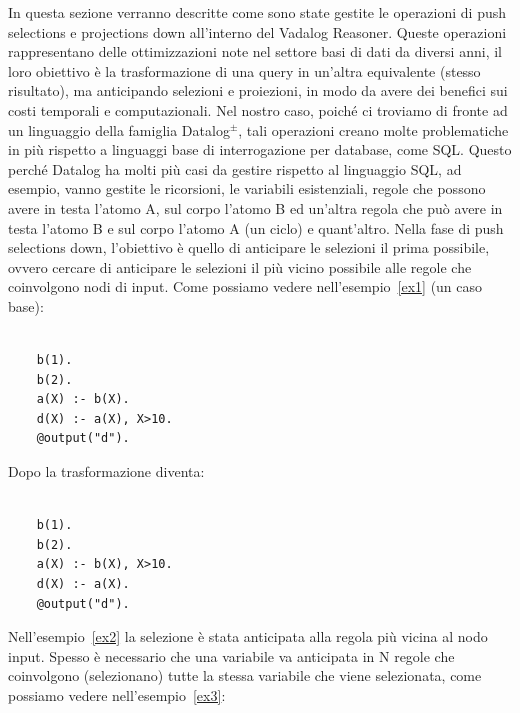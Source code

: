 In questa sezione verranno descritte come sono state gestite le operazioni di push selections e projections down all'interno del Vadalog Reasoner. \newline
Queste operazioni rappresentano delle ottimizzazioni note nel settore basi di dati da diversi anni, il loro obiettivo è la trasformazione di una query in un'altra equivalente (stesso risultato), ma anticipando selezioni e proiezioni, in modo da avere dei benefici sui costi temporali e computazionali. \newline
Nel nostro caso, poiché ci troviamo di fronte ad un linguaggio della famiglia Datalog$^\pm$, tali operazioni creano molte problematiche in più rispetto a linguaggi base di interrogazione per database, come SQL. \newline
Questo perché Datalog ha molti più casi da gestire rispetto al linguaggio SQL, ad esempio, vanno gestite le ricorsioni, le variabili esistenziali, regole che possono avere in testa l'atomo A, sul corpo l'atomo B ed un'altra regola che può avere in testa l'atomo B e sul corpo l'atomo A (un ciclo) e quant'altro. \newline 
Nella fase di push selections down, l'obiettivo è quello di anticipare le selezioni il prima possibile, ovvero cercare di anticipare le selezioni il più vicino possibile alle regole che coinvolgono nodi di input. Come possiamo vedere nell'esempio~\ref{ex1} (un caso base): 
\begin{example}\label{ex1}
\normalfont
{}
\begin{lstlisting}
	
	b(1). 
	b(2). 
	a(X) :- b(X). 
	d(X) :- a(X), X>10. 
	@output("d").
\end{lstlisting}
\end{example}
Dopo la trasformazione diventa: 
\begin{example}\label{ex2}
	\normalfont
	\begin{lstlisting}
	
	b(1). 
	b(2). 
	a(X) :- b(X), X>10. 
	d(X) :- a(X). 
	@output("d").
	\end{lstlisting}
\end{example}
Nell'esempio~\ref{ex2} la selezione è stata anticipata alla regola più vicina al nodo input. \newline
Spesso è necessario che una variabile va anticipata in N regole che coinvolgono (selezionano) tutte la stessa variabile che viene selezionata, come possiamo vedere nell'esempio~\ref{ex3}: 
